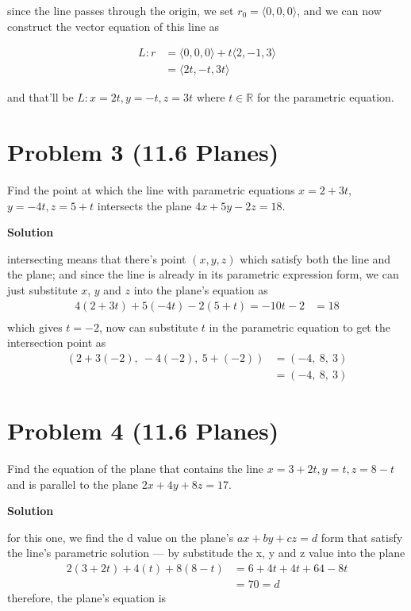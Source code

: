 \documentclass{article}
\newcommand{\solution}{\textbf{\large Solution}}
\theoremstyle{remark}
\begin{document}
  since the line passes through the origin, we set $r_0 = \langle 0, 0, 0\rangle$,
  and we can now construct the vector equation of this line as

  \[
  \begin{aligned}
  L: r &= \langle 0, 0, 0\rangle + t\langle 2, -1, 3\rangle \\
  &= \langle 2t, -t, 3t\rangle
  \end{aligned}
  \]

  and that'll be $\boxed{L: x = 2t, y = -t, z = 3t \text{ where } t \in
  \mathbb{R}}$ for the parametric equation.

\vspace{1em}
\hrulefill

\newpage
\section*{Problem 3 (11.6 Planes)}
Find the point at which the line with parametric equations $x = 2 + 3t$,
$y = -4t, z = 5 + t$ intersects the plane $4x + 5y - 2z = 18$.

\medskip
\solution

intersecting means that there’s point $(x, y, z)$ which satisfy both the line
and the plane; and since the line is already in its parametric expression form,
we can just substitute $x$, $y$ and $z$ into the plane’s equation as
  \[
  \begin{aligned}
  4(2 + 3t) + 5(-4t) - 2(5 + t) = -10t - 2 &= 18 \\
  \end{aligned}
  \]
which gives $t = -2$, now can substitute $t$ in the parametric equation to get
the intersection point as
  \[
  \begin{aligned}
  (2 + 3(-2),\ -4(-2),\ 5 + (-2)) &= (-4,\ 8,\ 3) \\
  &= \boxed{(-4,\ 8,\ 3)}
  \end{aligned}
  \]

\vspace{1em}
\hrulefill

\section*{Problem 4 (11.6 Planes)}
Find the equation of the plane that contains the line $x = 3 + 2t, y = t, z = 8 - t$ and is parallel to the plane $2x + 4y + 8z = 17$.

\medskip
\solution

 for this one, we find the d value on the plane's $ax + by +
  cz = d$ form that satisfy the line's parametric solution ---
  by substitude the x, y and z value into the plane
  \[
  \begin{aligned}
  2(3 + 2t) + 4(t) + 8(8 - t) &= 6 + 4t + 4t + 64 - 8t \\
  &= 70 = d
  \end{aligned}
  \]
  therefore, the plane's equation is 
\end{document}
